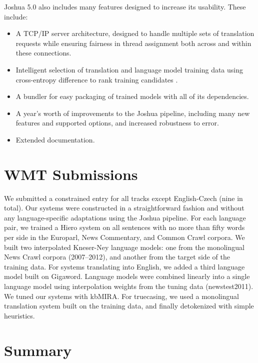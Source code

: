 \documentclass[11pt]{article}
\begin{document}
Joshua 5.0 also includes many features designed to increase its
usability.  These include:

\begin{itemize}
\item A TCP/IP server architecture, designed to handle multiple sets
  of translation requests while ensuring fairness in thread assignment
  both across and within these connections.
\item Intelligent selection of translation and language model training
  \cite{moore2010intelligent,axelrod-he-gao:2011:EMNLP} data using
  cross-entropy difference to rank training candidates
  \cite{orland-taus}.
\item A bundler for easy packaging of trained models with
  all of its dependencies.
\item A year's worth of improvements to the Joshua pipeline, including many
  new features and supported options, and increased robustness to error.
\item Extended documentation.
\end{itemize}


\section{WMT Submissions}

We submitted a constrained entry for all tracks except English-Czech
(nine in total). Our systems were constructed in a straightforward
fashion and without any language-specific adaptations using the Joshua
pipeline. For each language pair, we trained a Hiero system on all
sentences with no more than fifty words per side in the Europarl, News
Commentary, and Common Crawl corpora. We built two interpolated Kneser-Ney language
models: one from the monolingual News Crawl corpora (2007--2012), and
another from the target side of the training data.  For systems
translating into English, we added a third language model built on
Gigaword. Language models were combined linearly into a single
language model using interpolation weights from the tuning data
(newstest2011).  We tuned our systems with kbMIRA. For truecasing, 
we used a monolingual translation system built on the training data,
and finally detokenized with simple heuristics.

\section{Summary}
\end{document}
